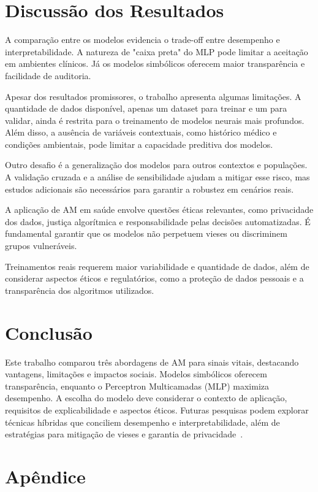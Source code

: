 \documentclass[11pt]{article}
\begin{document}
\section{Discussão dos Resultados}
A comparação entre os modelos evidencia o trade-off entre desempenho e interpretabilidade. A natureza de "caixa preta" do MLP pode limitar a aceitação em ambientes clínicos. Já os modelos simbólicos oferecem maior transparência e facilidade de auditoria.

Apesar dos resultados promissores, o trabalho apresenta algumas limitações. A quantidade de dados disponível, apenas um dataset para treinar e um para validar, ainda é restrita para o treinamento de modelos neurais mais profundos. Além disso, a ausência de variáveis contextuais, como histórico médico e condições ambientais, pode limitar a capacidade preditiva dos modelos.

Outro desafio é a generalização dos modelos para outros contextos e populações. A validação cruzada e a análise de sensibilidade ajudam a mitigar esse risco, mas estudos adicionais são necessários para garantir a robustez em cenários reais.

A aplicação de AM em saúde envolve questões éticas relevantes, como privacidade dos dados, justiça algorítmica e responsabilidade pelas decisões automatizadas. É fundamental garantir que os modelos não perpetuem vieses ou discriminem grupos vulneráveis.

Treinamentos reais requerem maior variabilidade e quantidade de dados, além de considerar aspectos éticos e regulatórios, como a proteção de dados pessoais e a transparência dos algoritmos utilizados.

\section{Conclusão}
Este trabalho comparou três abordagens de AM para sinais vitais, destacando vantagens, limitações e impactos sociais. Modelos simbólicos oferecem transparência, enquanto o Perceptron Multicamadas (MLP) maximiza desempenho. A escolha do modelo deve considerar o contexto de aplicação, requisitos de explicabilidade e aspectos éticos. Futuras pesquisas podem explorar técnicas híbridas que conciliem desempenho e interpretabilidade, além de estratégias para mitigação de vieses e garantia de privacidade~\cite{mehrabi2021survey,voigt2017gdpr}.




\appendix
\section*{Apêndice}
\end{document}
